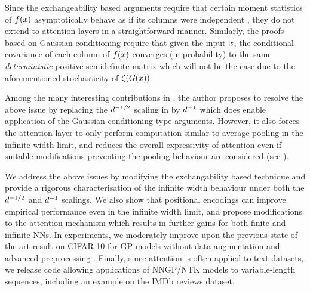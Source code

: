 \documentclass{article}
\begin{document}
Since the exchangeability based arguments
\citep{matthews2018gaussian,garriga2019deep} require that certain moment statistics of $f(x)$ asymptotically behave as if its columns were independent \citep[see condition {\em b} in lemma 10,][]{matthews2018gaussian}, they do not extend to attention layers in a straightforward manner.
Similarly, the proofs based on Gaussian conditioning \citep{novak2019bayesian,yang2019v2} require that given the input $x$, the conditional covariance of each column of $f(x)$ converges (in probability) to the same \emph{deterministic} positive semidefinite matrix \citep[see propositions 5.5 and G.4 in][]{yang2019v2} which will not be the case due to the aforementioned stochasticity of $\zeta(G(x))$.

Among the many interesting contributions in \citep{yang2019v2}, the author proposes to resolve the above issue by replacing the $d^{-1/2}$ scaling in  by $d^{-1}$ which does enable application of the Gaussian conditioning type arguments.
However, it also forces the attention layer to only perform computation similar to average pooling in the infinite width limit, and reduces the overall expressivity of attention even if suitable modifications preventing the pooling behaviour are considered (see ).

We address the above issues by modifying the exchangability based technique and provide a rigorous characterisation of the infinite width behaviour under both the $d^{-1/2}$ and $d^{-1}$ scalings.
We also show that positional encodings \citep{gehring2017convolutional,vaswani2017attention} can improve empirical performance even in the infinite width limit, and propose modifications to the attention mechanism which results in further gains for both finite and infinite NNs.
In experiments, we moderately improve upon the previous state-of-the-art result on CIFAR-10 for GP models without data augmentation and advanced preprocessing \citep[cf.][]{li2019enhanced}.
Finally, since attention is often applied to text datasets, we release code allowing applications of NNGP/NTK models to variable-length sequences, including an example on the IMDb reviews dataset.
\end{document}
